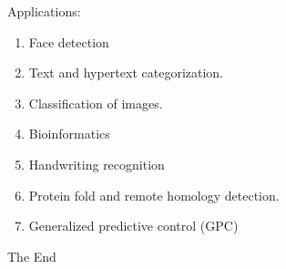 \documentclass{beamer}
\begin{document}
\begin{frame}{Applications:}
	\begin{enumerate}
		\item Face detection
		\item Text and hypertext categorization.
		\item Classification of images.
		\item Bioinformatics
		\item Handwriting recognition
		\item Protein fold and remote homology detection.
		\item Generalized predictive control (GPC)
	\end{enumerate}
\end{frame}

\begin{frame}
\huge{\centerline{The End}}
\end{frame}
\end{document}
